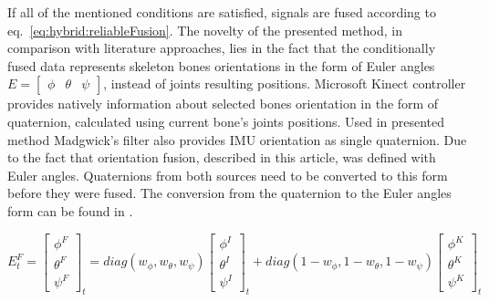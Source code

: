 \documentclass[sensors,article,submit,moreauthors,pdftex,10pt,a4paper]{mdpi}
\begin{document}
If all of the mentioned conditions are satisfied, signals are fused according to eq.~\ref{eq:hybrid:reliableFusion}. The novelty of the presented method, in comparison with literature approaches, lies in the fact that the conditionally fused data represents skeleton bones orientations in the form of Euler angles $E = \begin{bmatrix} \phi &  \theta & \psi \end{bmatrix}$, instead of joints resulting positions. Microsoft Kinect controller provides natively information about selected bones orientation in the form of quaternion, calculated using current bone's joints positions. Used in presented method Madgwick's filter also provides IMU orientation as single quaternion. Due to the fact that orientation fusion, described in this article, was defined with Euler angles. Quaternions from both sources need to be converted to this form before they were fused. The conversion from the quaternion to the Euler angles form can be found in \cite{Dunn2011}.
		
\begin{equation} E^F_t = 
	\begin{bmatrix}  \phi^F \\  \theta^F \\  \psi^F \end{bmatrix}_t = 
	diag(w_\phi,w_\theta,w_\psi)
	\begin{bmatrix}  \phi^I \\  \theta^I \\  \psi^I \end{bmatrix}_t + 
	diag(1-w_\phi,1-w_\theta,1-w_\psi)
	\begin{bmatrix}  \phi^K \\  \theta^K \\  \psi^K \end{bmatrix}_t
	\label{eq:hybrid:reliableFusion}
\end{equation}
		
\end{document}
